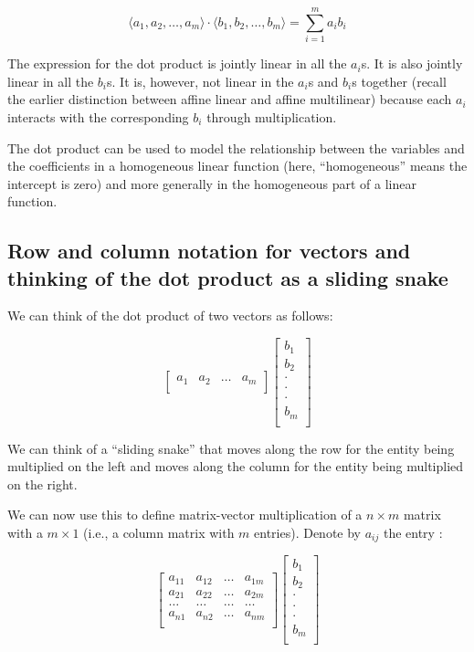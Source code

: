 \documentclass[10pt]{amsart}
\begin{document}
$$\langle a_1,a_2,\dots,a_m \rangle \cdot \langle b_1,b_2,\dots,b_m \rangle = \sum_{i=1}^m a_ib_i$$

The expression for the dot product is jointly linear in all the
$a_i$s. It is also jointly linear in all the $b_i$s. It is, however,
not linear in the $a_i$s and $b_i$s together (recall the earlier
distinction between affine linear and affine multilinear) because each
$a_i$ interacts with the corresponding $b_i$ through multiplication.

The dot product can be used to model the relationship between the
variables and the coefficients in a homogeneous linear function (here,
``homogeneous'' means the intercept is zero) and more generally in the
homogeneous part of a linear function.

\subsection{Row and column notation for vectors and thinking of the dot product as a sliding snake}

We can think of the dot product of two vectors as follows:

$$\left[\begin{matrix}a_1 & a_2 & \dots & a_m \\\end{matrix}\right] \left[\begin{matrix} b_1 \\ b_2 \\ \cdot \\ \cdot \\ \cdot \\ b_m \\\end{matrix}\right]$$

We can think of a ``sliding snake'' that moves along the row for the
entity being multiplied on the left and moves along the column for the
entity being multiplied on the right.

We can now use this to define matrix-vector multiplication of a $n
\times m$ matrix with a $m \times 1$ (i.e., a column matrix with $m$
entries). Denote by $a_{ij}$ the entry :

$$\left[\begin{matrix} a_{11} & a_{12} & \dots & a_{1m} \\ a_{21} & a_{22} & \dots & a_{2m} \\ \dots & \dots & \dots & \dots \\ a_{n1} & a_{n2} & \dots & a_{nm} \\\end{matrix}\right] \left[\begin{matrix} b_1 \\ b_2 \\ \cdot \\ \cdot \\ \cdot \\ b_m \\\end{matrix}\right]$$
\end{document}
